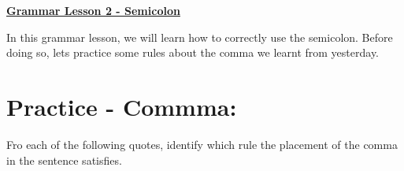 \documentclass[12pt]{article} %
\begin{document}
	\renewcommand*{\coursecode}{MATH 235} %
	\renewcommand*{\assgnnumber}{Assignment 1} %
	\renewcommand*{\submdate}{September 14, 2021} %
	\renewcommand*{\studentfname}{Abdullah} %
	\renewcommand*{\studentlname}{Zubair} %
    \renewcommand*{\proofname}{Proof:}

	\renewcommand\qedsymbol{$\blacksquare$}
	\setfigpath
	\fancyhfoffset[L,O]{0pt} %




\begin{center}
  \textbf{\underline{\Huge{Grammar Lesson 2 - Semicolon}}}
\end{center}

In this grammar lesson, we will learn how to correctly use the semicolon. Before doing so, lets practice some rules about the comma we learnt from yesterday. 

\section*{Practice - Commma:}
Fro each of the following quotes, identify which rule the placement of the comma in the sentence satisfies. 
\end{document}
